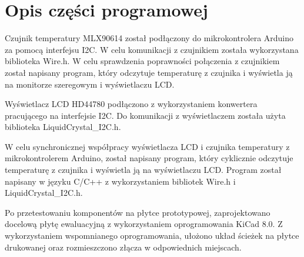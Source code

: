 \chapter{Opis części programowej}

Czujnik temperatury MLX90614 został podłączony do mikrokontrolera Arduino za pomocą interfejsu I2C. W celu komunikacji z czujnikiem została wykorzystana biblioteka Wire.h. W celu sprawdzenia poprawności połączenia z czujnikiem został napisany program, który odczytuje temperaturę z czujnika i wyświetla ją na monitorze szeregowym i wyświetlaczu LCD. 


Wyświetlacz LCD HD44780 podłączono z wykorzystaniem konwertera pracującego na interfejsie I2C. Do komunikacji z wyświetlaczem została użyta biblioteka LiquidCrystal\_I2C.h.


W celu synchronicznej współpracy wyświetlacza LCD i czujnika temperatury z mikrokontrolerem Arduino, został napisany program, który cyklicznie odczytuje temperaturę z czujnika i wyświetla ją na wyświetlaczu LCD. Program został napisany w języku C/C++ z wykorzystaniem bibliotek Wire.h i LiquidCrystal\_I2C.h.


Po przetestowaniu komponentów na płytce prototypowej, zaprojektowano docelową płytę ewaluacyjną z wykorzystaniem oprogramowania KiCad 8.0.  Z wykorzystaniem wspomnianego oprogramowania, ułożono układ ścieżek na płytce drukowanej oraz rozmieszczono złącza w odpowiednich miejscach.

\vspace{12pt}

